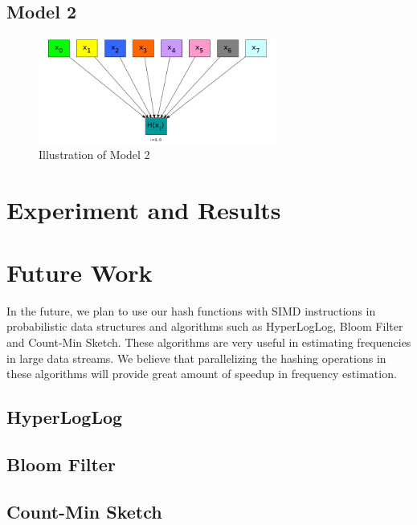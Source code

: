 \documentclass[11pt,oneside,a4paper]{article}
\makeatletter
\def\cleardoublepage{\clearpage\if@twoside \ifodd\c@page\else%
\hbox{}%
\thispagestyle{empty}%
\clearpage%
\if@twocolumn\hbox{}\clearpage\fi\fi\fi}
\makeatother
\begin{document}
\subsection{Model 2}
\begin{figure}[H]
\centering
\includegraphics[width=0.7\textwidth]{multi_data_single_hash.png} 
\caption{Illustration of Model 2}
\end{figure}

\section{Experiment and Results}
\section{Future Work}
In the future, we plan to use our hash functions with SIMD instructions in probabilistic data structures and algorithms such as HyperLogLog, Bloom Filter and Count-Min Sketch. These algorithms are very useful in estimating frequencies in large data streams.  We believe that parallelizing the hashing operations in these algorithms  will provide great amount of speedup in frequency estimation. 
\subsection{HyperLogLog}

\subsection{Bloom Filter}
\subsection{Count-Min Sketch}
\cleardoublepage
{}

\cleardoublepage
\end{document}
